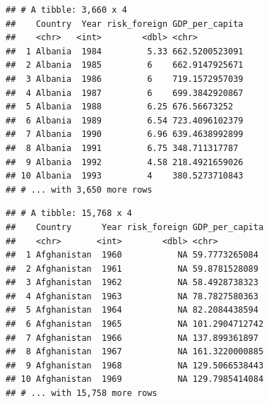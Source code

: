 \documentclass[11pt,]{article}
\newenvironment{Shaded}{\begin{snugshade}}{\end{snugshade}}
\newcommand{\KeywordTok}[1]{\textcolor[rgb]{0.13,0.29,0.53}{\textbf{#1}}}
\newcommand{\DataTypeTok}[1]{\textcolor[rgb]{0.13,0.29,0.53}{#1}}
\newcommand{\StringTok}[1]{\textcolor[rgb]{0.31,0.60,0.02}{#1}}
\newcommand{\CommentTok}[1]{\textcolor[rgb]{0.56,0.35,0.01}{\textit{#1}}}
\newcommand{\OperatorTok}[1]{\textcolor[rgb]{0.81,0.36,0.00}{\textbf{#1}}}
\newcommand{\NormalTok}[1]{#1}
\begin{document}
\begin{verbatim}
## # A tibble: 3,660 x 4
##    Country  Year risk_foreign GDP_per_capita
##    <chr>   <int>        <dbl> <chr>         
##  1 Albania  1984         5.33 662.5200523091
##  2 Albania  1985         6    662.9147925671
##  3 Albania  1986         6    719.1572957039
##  4 Albania  1987         6    699.3842920867
##  5 Albania  1988         6.25 676.56673252  
##  6 Albania  1989         6.54 723.4096102379
##  7 Albania  1990         6.96 639.4638992899
##  8 Albania  1991         6.75 348.711317787 
##  9 Albania  1992         4.58 218.4921659026
## 10 Albania  1993         4    380.5273710843
## # ... with 3,650 more rows
\end{verbatim}

\begin{Shaded}
\end{Shaded}

\begin{verbatim}
## # A tibble: 15,768 x 4
##    Country      Year risk_foreign GDP_per_capita
##    <chr>       <int>        <dbl> <chr>         
##  1 Afghanistan  1960           NA 59.7773265084 
##  2 Afghanistan  1961           NA 59.8781528089 
##  3 Afghanistan  1962           NA 58.4928738323 
##  4 Afghanistan  1963           NA 78.7827580363 
##  5 Afghanistan  1964           NA 82.2084438594 
##  6 Afghanistan  1965           NA 101.2904712742
##  7 Afghanistan  1966           NA 137.899361897 
##  8 Afghanistan  1967           NA 161.3220000885
##  9 Afghanistan  1968           NA 129.5066538443
## 10 Afghanistan  1969           NA 129.7985414084
## # ... with 15,758 more rows
\end{verbatim}
\end{document}
